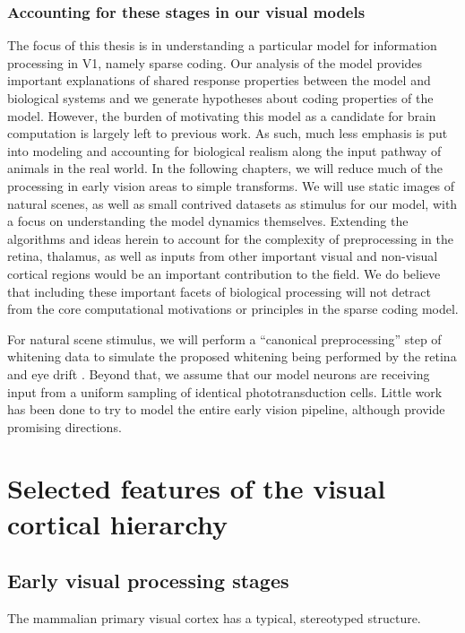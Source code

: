 \subsubsection{Accounting for these stages in our visual models}
The focus of this thesis is in understanding a particular model for information processing in V1, namely sparse coding. Our analysis of the model provides important explanations of shared response properties between the model and biological systems and we generate hypotheses about coding properties of the model. However, the burden of motivating this model as a candidate for brain computation is largely left to previous work. As such, much less emphasis is put into modeling and accounting for biological realism along the input pathway of animals in the real world. In the following chapters, we will reduce much of the processing in early vision areas to simple transforms. We will use static images of natural scenes, as well as small contrived datasets as stimulus for our model, with a focus on understanding the model dynamics themselves. Extending the algorithms and ideas herein to account for the complexity of preprocessing in the retina, thalamus, as well as inputs from other important visual and non-visual cortical regions would be an important contribution to the field. We do believe that including these important facets of biological processing will not detract from the core computational motivations or principles in the sparse coding model.

For natural scene stimulus, we will perform a ``canonical preprocessing'' step of whitening data to simulate the proposed whitening being performed by the retina and eye drift \cite{atick1992what, rucci2015unsteady}. Beyond that, we assume that our model neurons are receiving input from a uniform sampling of identical phototransduction cells. Little work has been done to try to model the entire early vision pipeline, although \cite{shan2013efficient, doi2007theory, lindsey2019unified} provide promising directions.

\section{Selected features of the visual cortical hierarchy}


\subsection{Early visual processing stages}
The mammalian primary visual cortex has a typical, stereotyped structure. 


